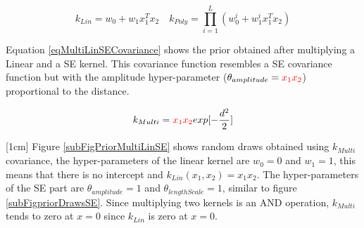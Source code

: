 \begin{equation}\label{eqCh4PolynomialCovariance}
k_{Lin} = w_{0} + w_{1}x_{1}^T x_{2} \quad k_{Poly} = \prod_{i=1}^{L} \left (w_{0}^{i} + w_{1}^{i}x_{1}^T x_{2} \right)
\end{equation}

Equation \ref{eqMultiLinSECovariance} shows the prior obtained after multiplying a Linear and a SE kernel. This covariance function resembles a SE covariance function but with the amplitude hyper-parameter ($\theta_{amplitude} = \textcolor{red}{x_{1}x_{2}}$) proportional to the  distance. 

\begin{equation}\label{eqMultiLinSECovariance}
k_{Multi} = \textcolor{red}{x_{1}x_{2}} exp[- \frac{d^2}{2}]
\end{equation}

[1cm]
Figure \ref{subFigPriorMultiLinSE} shows random draws obtained using $k_{Multi}$ covariance,  the hyper-parameters of the linear kernel are $w_{0}=0$ and $w_{1}=1$, this means that there is no intercept and $k_{Lin}(x_{1}, x_{2}) = x_{1}x_{2}$. The hyper-parameters of the SE part are $\theta_{amplitude}=1$ and $\theta_{lengthScale}=1$, similar to figure \ref{subFigpriorDrawsSE}. Since multiplying two kernels is an AND operation, $k_{Multi}$ tends to zero at $x=0$ since $k_{Lin}$ is zero at $x=0$. 

